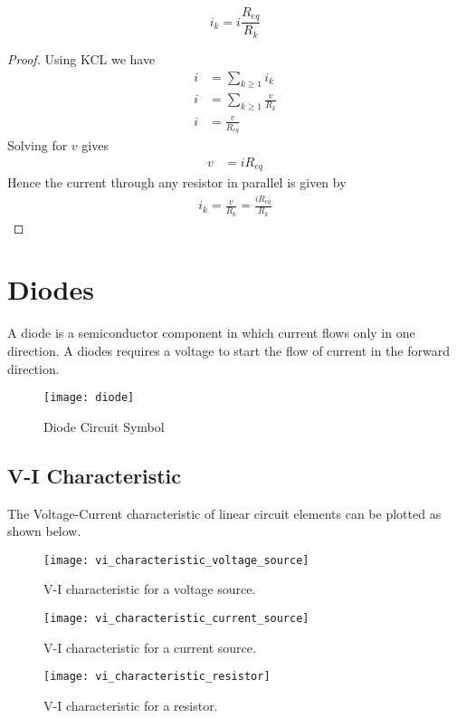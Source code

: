 \documentclass{article}
\begin{document}
\begin{theorem}
    \begin{equation*}
        i_k = i \frac{R_{eq}}{R_k}
    \end{equation*}
\end{theorem}
\begin{proof}
    Using KCL we have
    \begin{align*}
        i &= \sum_{k\geq1} i_k \\
        i &= \sum_{k\geq1} \frac{v}{R_k} \\
        i &= \frac{v}{R_{eq}}
    \end{align*}
    Solving for $v$ gives
    \begin{align*}
        v &= i R_{eq} 
    \end{align*}
    Hence the current through any resistor in parallel is given by
    \begin{align*}
        i_k = \frac{v}{R_k} = \frac{iR_{eq}}{R_k}
    \end{align*}
\end{proof}
\newpage 
\section{Diodes}
\begin{definition}[Diode]
    A diode is a semiconductor component in which current flows only in one direction. A diodes requires a voltage to start the flow of current in the forward direction.
\end{definition}
\begin{figure}[H]
    \centering
    \texttt{[image: diode]}
    \caption{Diode Circuit Symbol}
\end{figure}
\subsection{V-I Characteristic}
The Voltage-Current characteristic of linear circuit elements can be plotted as shown below.
\begin{figure}[H]
    \centering
    \texttt{[image: vi\_characteristic\_voltage\_source]}
    \caption{V-I characteristic for a voltage source.}
\end{figure}
\begin{figure}[H]
    \centering
    \texttt{[image: vi\_characteristic\_current\_source]}
    \caption{V-I characteristic for a current source.}
\end{figure}
\begin{figure}[H]
    \centering
    \texttt{[image: vi\_characteristic\_resistor]}
    \caption{V-I characteristic for a resistor.}
\end{figure}
\end{document}
